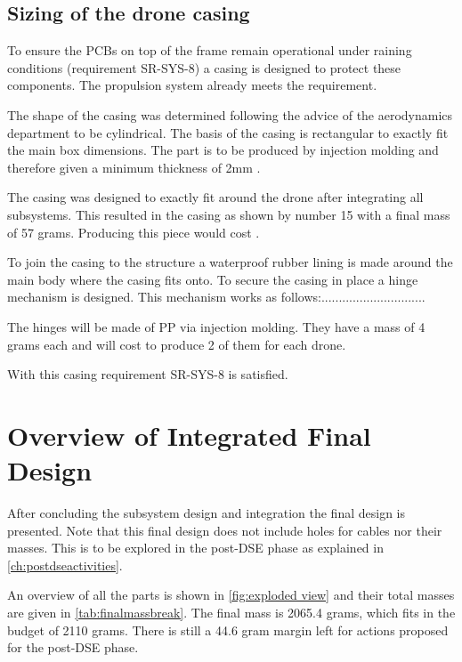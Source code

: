 \subsection{Sizing of the drone casing} 
To ensure the PCBs on top of the frame remain operational under raining conditions (requirement SR-SYS-8) a casing is designed to protect these components. The propulsion system already meets the requirement.

The shape of the casing was determined following the advice of the aerodynamics department to be cylindrical. The basis of the casing is rectangular to exactly fit the main box dimensions. The part is to be produced by injection molding and therefore given a minimum thickness of 2mm \cite{minmolding}. 

The casing was designed to exactly fit around the drone after integrating all subsystems. This resulted in the casing as shown by number 15 with a final mass of 57 grams. Producing this piece would cost  \cite{materialbible}.

To join the casing to the structure a waterproof rubber lining is made around the main body where the casing fits onto. To secure the casing in place a hinge mechanism is designed. This mechanism works as follows:..............................

The hinges will be made of PP via injection molding. They have a mass of 4 grams each and will cost  to produce 2 of them for each drone.

With this casing requirement SR-SYS-8 is satisfied.





\section{Overview of Integrated Final Design}
\label{SI:final design}
After concluding the subsystem design and integration the final design is presented. Note that this final design does not include holes for cables nor their masses. This is to be explored in the post-DSE phase as explained in \autoref{ch:postdseactivities}.

An overview of all the parts is shown in \autoref{fig:exploded view} and their total masses are given in \autoref{tab:finalmassbreak}. The final mass is 2065.4 grams, which fits in the budget of 2110 grams. There is still a 44.6 gram margin left for actions proposed for the post-DSE phase.

